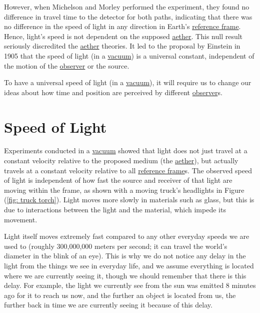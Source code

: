 However, when Michelson and Morley performed the experiment, they found no difference in travel time to the detector for both paths, indicating that there was no difference in the speed of light in any direction in Earth's \hyperlink{def-Reference-frame}{reference frame}.
Hence, light's speed is not dependent on the supposed \hyperlink{def-aether}{aether}.
This null result seriously discredited the \hyperlink{def-aether}{aether} theories.
It led to the proposal by Einstein in 1905 that the speed of light (in a \hyperlink{def-vacuum}{vacuum}) is a universal constant, independent of the motion of the \hyperlink{def-observer}{observer} or the source.

To have a universal speed of light (in a \hyperlink{def-vacuum}{vacuum}), it will require us to change our ideas about how time and position are perceived by different \hyperlink{def-observer}{observer}s.

\section{Speed of Light} \label{sect: Speed of Light}

Experiments conducted in a \hyperlink{def-vacuum}{vacuum} showed that light does not just travel at a constant velocity relative to the proposed medium (the \hyperlink{def-aether}{aether}), but actually travels at a constant velocity relative to all \hyperlink{def-Reference-frame}{reference frame}s.
The observed speed of light is independent of how fast the source and receiver of that light are moving within the frame, as shown with a moving truck's headlights in Figure (\ref{fig: truck torch}).
Light moves more slowly in materials such as glass, but this is due to interactions between the light and the material, which impede its movement.

Light itself moves extremely fast compared to any other everyday speeds we are used to (roughly 300,000,000 meters per second; it can travel the world's diameter in the blink of an eye).
This is why we do not notice any delay in the light from the things we see in everyday life, and we assume everything is located where we are currently seeing it, though we should remember that there is this delay.
For example, the light we currently see from the sun was emitted 8 minutes ago for it to reach us now, and the further an object is located from us, the further back in time we are currently seeing it because of this delay.

